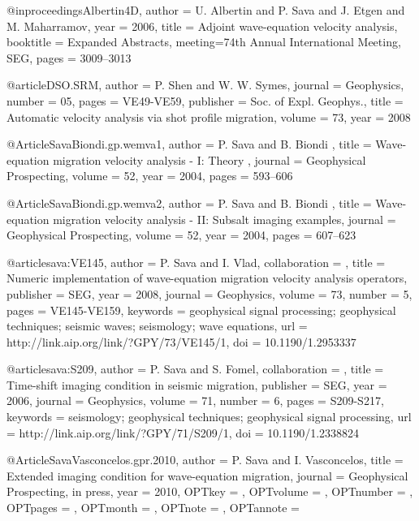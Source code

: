 {@inproceedings{Albertin4D,
  author = {U. Albertin and P. Sava and J. Etgen and M.
Maharramov},
  year = {2006},
  title = { Adjoint wave-equation velocity analysis},
  booktitle = {Expanded Abstracts},
  meeting={74th Annual International Meeting, SEG},
  pages = {3009--3013}
}

@article{DSO.SRM,
  author = {P. Shen and W. W. Symes},
  journal = {Geophysics},
  number = {05},
  pages = {VE49-VE59},
  publisher = {Soc. of Expl. Geophys.},
  title = {Automatic velocity analysis via shot profile migration},
  volume = {73},
  year = {2008}}


@Article{SavaBiondi.gp.wemva1,
 author =  { P. Sava and B. Biondi },
 title =   { Wave-equation migration velocity analysis - {I}: {Theory} },
 journal = {Geophysical Prospecting},
 volume = {52},
 year =   {2004},
 pages =  {593--606}
}

@Article{SavaBiondi.gp.wemva2,
 author =  { P. Sava and B. Biondi },
 title =   { Wave-equation migration velocity analysis - {II}:
{Subsalt} imaging examples},
 journal = {Geophysical Prospecting},
 volume = {52},
 year =   {2004},
 pages =  {607--623}
}




@article{sava:VE145,
author = {P. Sava and I. Vlad},
collaboration = {},
title = {Numeric implementation of wave-equation migration velocity analysis operators},
publisher = {SEG},
year = {2008},
journal = {Geophysics},
volume = {73},
number = {5},
pages = {VE145-VE159},
keywords = {geophysical signal processing; geophysical techniques; seismic waves; seismology; wave equations},
url = {http://link.aip.org/link/?GPY/73/VE145/1},
doi = {10.1190/1.2953337}
}




@article{sava:S209,
author = {P. Sava and S. Fomel},
collaboration = {},
title = {Time-shift imaging condition in seismic migration},
publisher = {SEG},
year = {2006},
journal = {Geophysics},
volume = {71},
number = {6},
pages = {S209-S217},
keywords = {seismology; geophysical techniques; geophysical signal processing},
url = {http://link.aip.org/link/?GPY/71/S209/1},
doi = {10.1190/1.2338824}
}



@Article{SavaVasconcelos.gpr.2010,
  author = 	 {P. Sava and I. Vasconcelos},
  title = 	 {Extended imaging condition for wave-equation migration},
  journal = 	 {Geophysical Prospecting, in press},
  year = 	 {2010},
  OPTkey = 	 {},
  OPTvolume = 	 {},
  OPTnumber = 	 {},
  OPTpages = 	 {},
  OPTmonth = 	 {},
  OPTnote = 	 {},
  OPTannote = 	 {}
}



}
